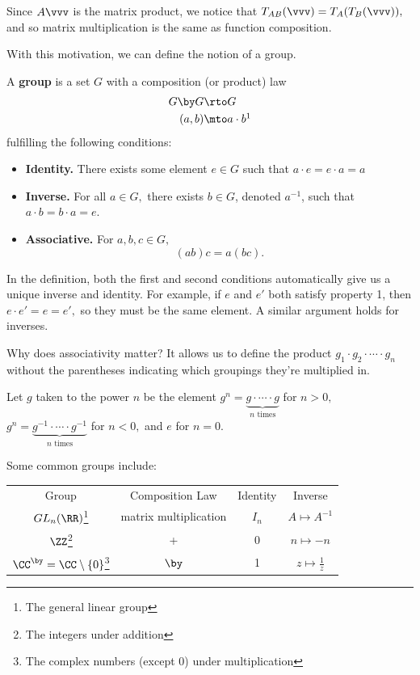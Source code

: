 Since $A\vvv$ is the matrix product, we notice that $T_{AB}(\vvv) = T_A(T_B(\vvv)),$ and so matrix multiplication is the same as function composition. 

With this motivation, we can define the notion of a group. 
\begin{definition}[Group]
A \textbf{group} is a set $G$ with a composition (or product) law 
\begin{align*}
    G \by G &\rto G \\
    (a, b) &\mto a\cdot b\footnotemark %
\end{align*}
fulfilling the following conditions:
\begin{itemize}
    \item \textbf{Identity.} There exists some element $e \in G$ such that $a \cdot e = e \cdot a = a$
    \item \textbf{Inverse.} For all $a \in G,$ there exists $b \in G$, denoted $a^{-1}$, such that $a \cdot b = b \cdot a = e$. 
    
    \item \textbf{Associative.} For $a, b, c \in G,$
    \[
    (ab)c = a(bc).
    \]
\end{itemize}
\end{definition}
In the definition, both the first and second conditions automatically give us a unique inverse and identity. For example, if $e$ and $e'$ both satisfy property 1, then $e\cdot e' = e = e',$ so they must be the same element. A similar argument holds for inverses. 

Why does associativity matter? It allows us to define the product $g_1 \cdot g_2\cdot  \cdots \cdot g_n$ without the parentheses indicating which groupings they're multiplied in. 

\begin{definition}
Let $g$ taken to the power $n$ be the element $g^n = \underbrace{g\cdot \cdots \cdot g}_{n \text{ times}}$ for $n > 0,$ $g^n = \underbrace{g^{-1}\cdot \cdots \cdot g^{-1}}_{n \text{ times}}$ for $n < 0,$ and $e$ for $n = 0.$
\end{definition}

\begin{example}
Some common groups include:

\begin{center}
\begin{tabular}{ c c c c }
 Group & Composition Law & Identity & Inverse \\ 
 $GL_n(\RR)$\footnote{The general linear group} & matrix multiplication & $I_n$ & $A \mapsto A^{-1}$ \\  
 $\ZZ$\footnote{The integers under addition} & + & 0 & $n \mapsto -n$ \\
 $\CC^{\by} = \CC\setminus \{0\}$\footnote{The complex numbers (except 0) under multiplication} & $\by$ & 1 & $z \mapsto \frac{1}{z}$
\end{tabular}
\end{center}

\end{example}

